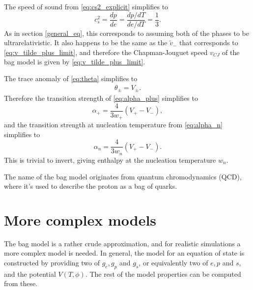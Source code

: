 The speed of sound from \eqref{eq:cs2_explicit} simplifies to
\begin{equation}
c_s^2 = \frac{dp}{de} = \frac{dp/dT}{de/dT} = \frac{1}{3}.
\end{equation}
As in section \ref{general_eq}, this corresponds to assuming both of the phases to be ultrarelativistic.
It also happens to be the same as the $\tilde{v}_-$ that corresponds to \eqref{eq:v_tilde_plus_limit}, and therefore the Chapman-Jouguet speed $v_{CJ}$ of the bag model is given by \eqref{eq:v_tilde_plus_limit}.

The trace anomaly of \eqref{eq:theta} simplifies to
\begin{align}
\theta_\pm = V_\pm.
\end{align}
Therefore the transition strength of \eqref{eq:alpha_plus} simplifies to
\begin{equation}
\alpha_+ = \frac{4}{3 w_+} (V_+ - V_-),
\label{eq:alpha_plus_bag}
\end{equation}
and the transition strength at nucleation temperature from \eqref{eq:alpha_n} simplifies to
\begin{equation}
\alpha_n = \frac{4}{3 w_n} (V_+ - V_-).
\label{eq:alpha_n_bag}
\end{equation}
This is trivial to invert, giving enthalpy at the nucleation temperature $w_n$.

The name of the bag model originates from quantum chromodynamics (QCD), where it's used to describe the proton as a bag of quarks.


\section{More complex models}
The bag model is a rather crude approximation, and for realistic simulations a more complex model is needed.
In general, the model for an equation of state is constructed by providing two of $g_e, g_p$ and $g_s$,
or equivalently two of $e, p$ and $s$, and the potential $V(T,\phi)$.
The rest of the model properties can be computed from these.

\iffalse
\begin{itemize}
    \item Bubble wall velocity $v_w$
    \item Nucleation temperature $T_n$, or equivalently nucleation enthalpy $w_n$ or transition strength $\alpha_n$
    \item Phase transition duration $\frac{1}{\beta}$ \todo{Check this}
    \item Equation of state
    \item Fraction of energy that is converted into fluid motion: $\kappa$ (???)
    \item Numerical prefactor from lattice simulations (???)
\end{itemize}
\fi

